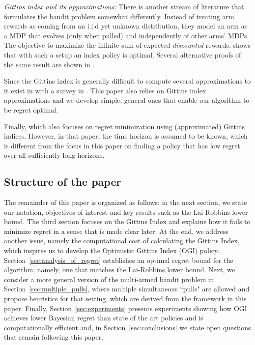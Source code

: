 \noindent\emph{Gittins index and its approximations: }
There is another stream of literature that formulates the bandit problem somewhat differently. Instead of treating arm rewards as coming from an i.i.d yet unknown distribution, they model an arm as a MDP that evolves (only when pulled)  and independently of other arms' MDPs. The objective to maximize the infinite sum of expected \emph{discounted} rewards. \cite{gittins1979bandit} shows that with such a setup an index policy is optimal. Several alternative proofs of the same result are shown in \cite{tsitsiklis1994short,weber1992gittins,whittle1980multi,bertsimas1996conservation}.
 
Since the Gittins index is generally difficult to compute several approximations to it exist in \cite{yao2006some,katehakis1987multi,varaiya1985extensions} with a survey in \cite{chakravorty2013multi}. This paper also relies on Gittins index approximations and we develop simple, general ones that enable our algorithm to be regret optimal.
 
Finally, \cite{lattimore2016bayesregret} which also focuses on regret minimization using (approximated) Gittins indices. However, in that paper, the time horizon is assumed to be known, which is different from the focus in this paper on finding a policy that has low regret over all sufficiently long horizons.

\subsection{Structure of the paper}
The remainder of this paper is organized as follows: in the next section, we state our notation, objectives of interest 
and key results such as the Lai-Robbins lower bound. The third section focuses on the Gittins Index and explains how it fails to minimize regret in a sense that is made clear later. At the end, we address another issue, namely the computational cost of calculating the Gittins Index, which inspires us to develop the Optimistic Gittins Index (OGI) policy. Section~\ref{sec:analysis_of_regret} establishes an optimal regret bound for the algorithm; namely, one that matches the Lai-Robbins lower bound. Next, we consider a more general version of the multi-armed bandit problem in Section~\ref{sec:multiple_pulls}, where multiple simultaneous ``pulls" are allowed and propose heuristics for that setting, which are derived from the framework in this paper. Finally, Section~\ref{sec:experiments} presents experiments showing how OGI achieves lower Bayesian regret than state of the art policies and is computationally efficient and, in Section~\ref{sec:conclusions} we state open questions that remain following this paper.